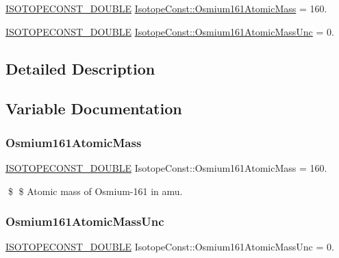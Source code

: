 \begin{DoxyCompactItemize}
\item 
\mbox{\hyperlink{group___isotope_const-_macros_ga8f45a7272ce02c0b4c65c44636ed719a}{I\+S\+O\+T\+O\+P\+E\+C\+O\+N\+S\+T\+\_\+\+D\+O\+U\+B\+LE}} \mbox{\hyperlink{group___isotope_const-_osmium-_os161_ga2f2626a0e5ca904efb2e1259ab97af21}{Isotope\+Const\+::\+Osmium161\+Atomic\+Mass}} = 160.
\item 
\mbox{\hyperlink{group___isotope_const-_macros_ga8f45a7272ce02c0b4c65c44636ed719a}{I\+S\+O\+T\+O\+P\+E\+C\+O\+N\+S\+T\+\_\+\+D\+O\+U\+B\+LE}} \mbox{\hyperlink{group___isotope_const-_osmium-_os161_ga8ee1de993af71b01f6c874b48108799d}{Isotope\+Const\+::\+Osmium161\+Atomic\+Mass\+Unc}} = 0.
\end{DoxyCompactItemize}


\subsection{Detailed Description}


\subsection{Variable Documentation}
\mbox{\label{group___isotope_const-_osmium-_os161_ga2f2626a0e5ca904efb2e1259ab97af21}} 
\subsubsection{\texorpdfstring{Osmium161\+Atomic\+Mass}{Osmium161AtomicMass}}
{\footnotesize\ttfamily \mbox{\hyperlink{group___isotope_const-_macros_ga8f45a7272ce02c0b4c65c44636ed719a}{I\+S\+O\+T\+O\+P\+E\+C\+O\+N\+S\+T\+\_\+\+D\+O\+U\+B\+LE}} Isotope\+Const\+::\+Osmium161\+Atomic\+Mass = 160.}

\$ \$ Atomic mass of Osmium-\/161 in amu. \mbox{\label{group___isotope_const-_osmium-_os161_ga8ee1de993af71b01f6c874b48108799d}} 
\subsubsection{\texorpdfstring{Osmium161\+Atomic\+Mass\+Unc}{Osmium161AtomicMassUnc}}
{\footnotesize\ttfamily \mbox{\hyperlink{group___isotope_const-_macros_ga8f45a7272ce02c0b4c65c44636ed719a}{I\+S\+O\+T\+O\+P\+E\+C\+O\+N\+S\+T\+\_\+\+D\+O\+U\+B\+LE}} Isotope\+Const\+::\+Osmium161\+Atomic\+Mass\+Unc = 0.}

